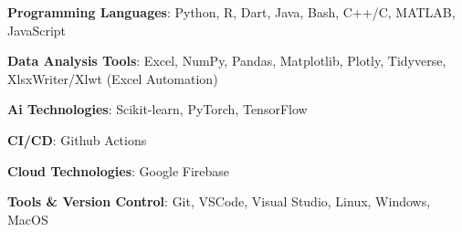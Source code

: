 \textbf{Programming Languages}: Python, R, Dart, Java, Bash, C++/C, MATLAB, JavaScript\par

\textbf{Data Analysis Tools}: Excel, NumPy, Pandas, Matplotlib, Plotly, Tidyverse, XlsxWriter/Xlwt (Excel Automation)\par

\textbf{Ai Technologies}: Scikit-learn, PyTorch, TensorFlow\par

\textbf{CI/CD}: Github Actions\par

\textbf{Cloud Technologies}: Google Firebase\par

\textbf{Tools & Version Control}: Git, VSCode, Visual Studio, Linux, Windows, MacOS\par

